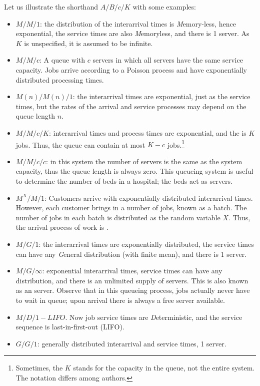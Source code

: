 Let us illustrate the shorthand $A/B/c/K$ with some examples:
\begin{itemize}
\item $M/M/1$: the distribution of the interarrival times is
  \emph{M}emory-less, hence exponential, the service times are also
  \emph{M}emoryless, and there is 1 server. As $K$ is unspecified, it
  is assumed to be infinite.
\item $M/M/c$: A  queue with $c$ servers in which
  all servers have the same service capacity. Jobs arrive according to a
  Poisson process and have exponentially distributed processing times.
\item $M(n)/M(n)/1$: the interarrival times are exponential, just as
  the service times, but the rates of the arrival and service processes
  may depend on the queue length $n$. 
\item $M/M/c/K$: interarrival times and process times are exponential,
  and the  is $K$ jobs. Thus, the queue can
  contain at most $K-c$ jobs.\footnote{Sometimes, the $K$ stands for
    the capacity in the queue, not the entire system. The notation differs among
    authors.}
\item $M/M/c/c$: in this system the number of servers is the same as
  the system capacity, thus the queue length is always zero. This
  queueing system is useful to determine the number of beds
  in a hospital; the beds act as servers.
\item $M^X/M/1$: Customers arrive with exponentially distributed
  interarrival times. However, each customer brings in a number of
  jobs, known as a batch. The number of jobs in each batch is
  distributed as the random variable $X$. Thus, the arrival process of
  work is .
\item $M/G/1$: the interarrival times are exponentially distributed,
  the service times can have any \emph{G}eneral distribution (with
  finite mean), and there is 1 server.
\item $M/G/\infty$: exponential interarrival times, service times can
  have any distribution, and there is an unlimited supply of
  servers. This is also known as an  server. Observe
  that in this queueing process, jobs actually never have to wait in
  queue; upon arrival there is always a free server available.
\item $M/D/1-LIFO$.  Now job service times are \emph{D}eterministic, and the service sequence is last-in-first-out (LIFO).
\item $G/G/1$: generally distributed interarrival and service times, 1 server.
\end{itemize}


